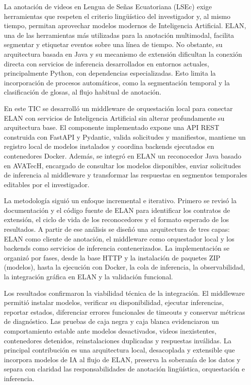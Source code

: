 La anotación de videos en Lengua de Señas Ecuatoriana (LSEc) exige herramientas que respeten el criterio lingüístico del investigador y, al mismo tiempo, permitan aprovechar modelos modernos de Inteligencia Artificial. ELAN, una de las herramientas más utilizadas para la anotación multimodal, facilita segmentar y etiquetar eventos sobre una línea de tiempo. No obstante, su arquitectura basada en Java y su mecanismo de extensión dificultan la conexión directa con servicios de inferencia desarrollados en entornos actuales, principalmente Python, con dependencias especializadas. Esto limita la incorporación de procesos automáticos, como la segmentación temporal y la clasificación de glosas, al flujo habitual de anotación.

En este TIC se desarrolló un middleware de orquestación local para conectar ELAN con servicios de Inteligencia Artificial sin alterar profundamente su arquitectura base. El componente implementado expone una API REST construida con FastAPI y Pydantic, valida solicitudes y manifiestos, mantiene un registro local de modelos instalados y coordina backends ejecutados en contenedores Docker. Además, se integró en ELAN un reconocedor Java basado en AVATecH, encargado de consultar los modelos disponibles, enviar solicitudes de inferencia al middleware y transformar las respuestas en segmentos temporales editables por el investigador.

La metodología siguió un enfoque incremental e iterativo. Primero se revisó la documentación y el código fuente de ELAN para identificar los contratos de extensión, el ciclo de vida de los reconocedores y el formato esperado de los resultados. A partir de ese análisis se diseñó una arquitectura de tres capas: ELAN como cliente de anotación, el middleware como orquestador local y los backends como servicios de inferencia contenerizados. La implementación se organizó por fases, desde la base HTTP y la instalación de paquetes ZIP (modelos), hasta la ejecución con Docker, la cola de inferencia, la observabilidad, la integración gráfica en ELAN y la validación funcional.

Los resultados confirmaron la viabilidad técnica de la integración. El middleware permitió instalar modelos, verificar su disponibilidad, ejecutar inferencias, reportar estados, diferenciar errores funcionales de timeouts y conservar métricas de diagnóstico. Las pruebas de caja negra y caja blanca evidenciaron un comportamiento estable ante modelos desactivados, videos inexistentes, contenedores detenidos, reinstalaciones duplicadas y respuestas inválidas. La principal contribución es una arquitectura local, desacoplada y extensible que incorpora modelos de IA al flujo de ELAN, preserva la soberanía de los datos y separa con claridad las responsabilidades de anotación lingüística, orquestación e inferencia.

